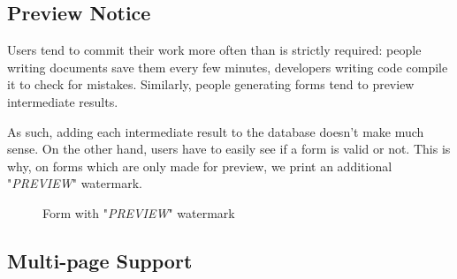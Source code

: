 \documentclass[11pt, a4paper]{report}
\begin{document}
\subsection{Preview Notice}

Users tend to commit their work more often than is strictly required: people writing documents save them every few minutes, developers writing code compile it to check for mistakes. Similarly, people generating forms tend to preview intermediate results.

As such, adding each intermediate result to the database doesn't make much sense. On the other hand, users have to easily see if a form is valid or not. This is why, on forms which are only made for preview, we print an additional "\textit{PREVIEW}" watermark.


\begin{figure}[!h]
    \centering
    \caption{Form with "\textit{PREVIEW}" watermark}
    \label{fig:label3}
\end{figure}

\subsection{Multi-page Support}
\end{document}

